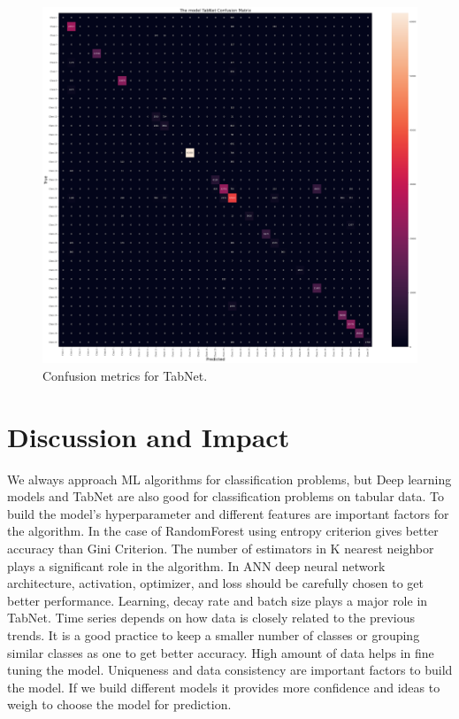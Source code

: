 \documentclass[conference,final,]{IEEEtran}
\begin{document}
\begin{figure}

{\centering \includegraphics[width=0.7\linewidth]{img/TabNet} 

}

\caption{Confusion metrics for TabNet.}\label{fig:unnamed-chunk-13c}
\end{figure}

\section{Discussion and Impact}\label{discussion-and-impact}

We always approach ML algorithms for classification problems, but Deep
learning models and TabNet are also good for classification problems on
tabular data. To build the model's hyperparameter and different features
are important factors for the algorithm. In the case of RandomForest
using entropy criterion gives better accuracy than Gini Criterion. The
number of estimators in K nearest neighbor plays a significant role in
the algorithm. In ANN deep neural network architecture, activation,
optimizer, and loss should be carefully chosen to get better
performance. Learning, decay rate and batch size plays a major role in
TabNet. Time series depends on how data is closely related to the
previous trends. It is a good practice to keep a smaller number of
classes or grouping similar classes as one to get better accuracy. High
amount of data helps in fine tuning the model. Uniqueness and data
consistency are important factors to build the model. If we build
different models it provides more confidence and ideas to weigh to
choose the model for prediction.
\end{document}
